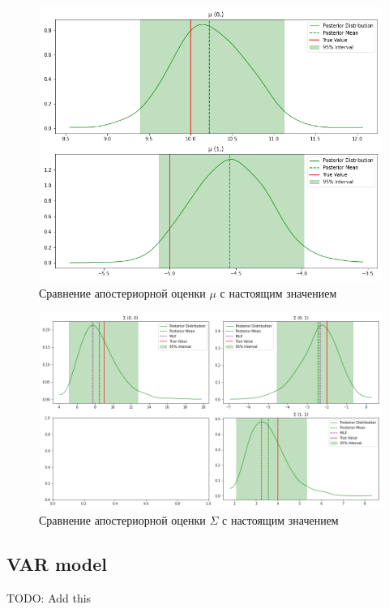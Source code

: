 \documentclass[a4paper,14pt]{extreport}
\begin{document}
\begin{figure}[H]
	\includegraphics[width=\linewidth]{img/gen/pp_mvn_mu_hdi.png}
	\caption{Сравнение апостериорной оценки $\mu$ с настоящим значением}
	\label{fig:pp_mvn_mu_hdi}
\end{figure}

\begin{figure}[H]
	\includegraphics[width=\linewidth]{img/gen/pp_mvn_sigma_hdi.png}
	\caption{Сравнение апостериорной оценки $\Sigma$ с настоящим значением}
	\label{fig:pp_mvn_sigma_hdi}
\end{figure}


\subsection{VAR model}

TODO: Add this
\end{document}
